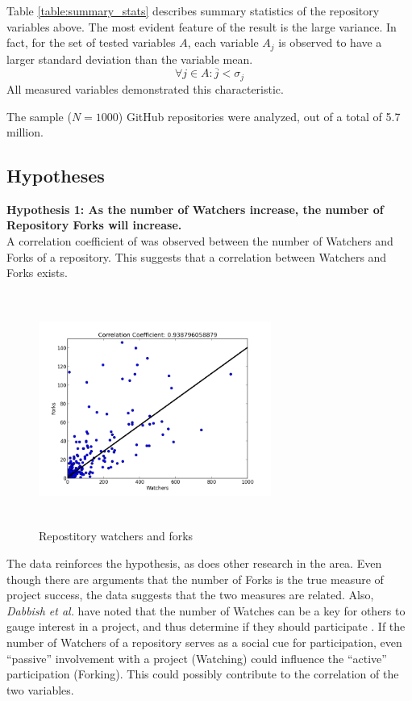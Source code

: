 \documentclass{proc}
\begin{document}
Table \ref{table:summary_stats} describes summary statistics of the repository variables above. The most evident feature of the result is the large variance. In fact, for the set of tested variables $A$, each variable $A_j$ is observed to have a larger standard deviation than the variable mean.
\begin{equation}
\forall j \in A \colon \overline{j} < \sigma_{j}
\label{eq:variance}
\end{equation}
All measured variables demonstrated this characteristic.

The sample ($N = 1000$) GitHub repositories were analyzed, out of a total of 5.7 million\cite{githubPress}.

\subsection{Hypotheses}
\textbf{Hypothesis 1: As the number of Watchers increase, the number of Repository Forks will increase.}\\
A correlation coefficient of  was observed between the number of Watchers and Forks of a repository. This suggests that a correlation between Watchers and Forks exists.

\begin{figure}
\includegraphics[height=3in,width=3in]{images/watcher_forks_scatterplot.png}
\caption{Repostitory watchers and forks}
\end{figure}

The data reinforces the hypothesis, as does other research in the area. Even though there are arguments that the number of Forks is the true measure of project success\cite{baudry2012towards}, the data suggests that the two measures are related. Also, \textit{Dabbish et al.} have noted that the number of Watches can be a key for others to gauge interest in a project, and thus determine if they should participate \cite{dabbish2013leveraging}. If the number of Watchers of a repository serves as a social cue for participation, even ``passive'' involvement with a project (Watching) could influence the ``active'' participation (Forking). This could possibly contribute to the correlation of the two variables.\\
\end{document}
